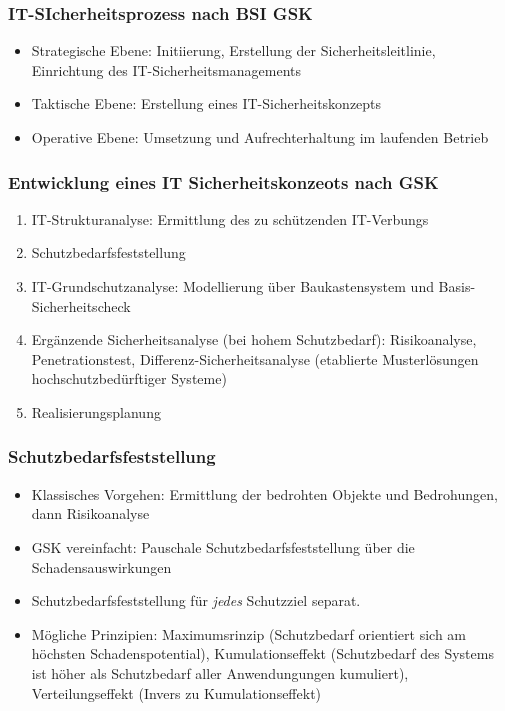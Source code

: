 \subsubsection{IT-SIcherheitsprozess nach BSI GSK}
\begin{itemize}
	\item Strategische Ebene: Initiierung, Erstellung der Sicherheitsleitlinie, Einrichtung des IT-Sicherheitsmanagements
	\item Taktische Ebene: Erstellung eines IT-Sicherheitskonzepts
	\item Operative Ebene: Umsetzung und Aufrechterhaltung im laufenden Betrieb
\end{itemize}

\subsubsection{Entwicklung eines IT Sicherheitskonzeots nach GSK}
\begin{enumerate}
	\item IT-Strukturanalyse: Ermittlung des zu schützenden IT-Verbungs
	\item Schutzbedarfsfeststellung
	\item IT-Grundschutzanalyse: Modellierung über Baukastensystem und Basis-Sicherheitscheck
	\item Ergänzende Sicherheitsanalyse (bei hohem Schutzbedarf): Risikoanalyse, Penetrationstest, Differenz-Sicherheitsanalyse (etablierte Musterlösungen hochschutzbedürftiger Systeme)
	\item Realisierungsplanung
\end{enumerate}

\subsubsection{Schutzbedarfsfeststellung}
\begin{itemize}
	\item Klassisches Vorgehen: Ermittlung der bedrohten Objekte und Bedrohungen, dann Risikoanalyse
	\item GSK vereinfacht: Pauschale Schutzbedarfsfeststellung über die Schadensauswirkungen
	\item Schutzbedarfsfeststellung für \textit{jedes} Schutzziel separat.
	\item Mögliche Prinzipien: Maximumsrinzip (Schutzbedarf orientiert sich am höchsten Schadenspotential), Kumulationseffekt (Schutzbedarf des Systems ist höher als Schutzbedarf aller Anwendungungen kumuliert), Verteilungseffekt (Invers zu Kumulationseffekt)
\end{itemize}

